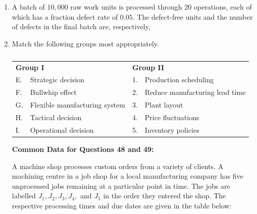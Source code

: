 \documentclass[journal,12pt,onecolumn]{IEEEtran}
\theoremstyle{remark}
\begin{document}
\begin{enumerate}
\item A batch of $10,000$ raw work units is processed through $20$ operations, each of which has a fraction defect rate of $0.05$. The defect-free units and the number of defects in the final batch are, respectively,
\hfill{}
\begin{enumerate}
\end{enumerate}

\item Match the following groups most appropriately.
\begin{table}[h]
\caption*{}
\label{tab:q47}
\centering
\begin{tabular}{llcl}
\multicolumn{2}{l}{\textbf{Group I}} & \multicolumn{2}{l}{\textbf{Group II}} \\
E. & Strategic decision & 1. & Production scheduling \\
F. & Bullwhip effect & 2. & Reduce manufacturing lead time \\
G. & Flexible manufacturing system & 3. & Plant layout \\
H. & Tactical decision & 4. & Price fluctuations \\
I. & Operational decision & 5. & Inventory policies \\
\end{tabular}
\end{table}
\hfill{}
\begin{enumerate}
\end{enumerate}
\noindent
\textbf{Common Data for Questions 48 and 49:}

\vspace{1em}

\noindent
A machine shop processes custom orders from a variety of clients. A machining centre in a job shop for a local manufacturing company has five unprocessed jobs remaining at a particular point in time. The jobs are labelled $J_1, J_2, J_3, J_4,$ and $J_5$ in the order they entered the shop. The respective processing times and due dates are given in the table below:


\end{enumerate}
\end{document}
